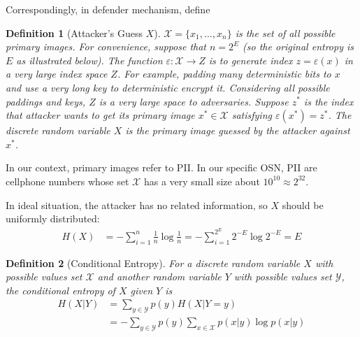 \documentclass[10pt, conference, compsocconf]{IEEEtran}
\newtheorem{mydef}{Definition}
\begin{document}
        Correspondingly, in defender mechanism, define
        \begin{mydef}[Attacker's Guess $X$]\label{def2}
            $\mathcal{X} = \{x_1, \ldots, x_n\}$ is the set of all possible
            primary images.
            For convenience, suppose that $n = 2^E$ (so the original entropy is $E$ as illustrated below).
            The function $\varepsilon: \mathcal X \rightarrow Z$ is to generate index $z = \varepsilon(x)$
            in a very large index space $Z$. For example, padding many deterministic bits to $x$ and use
            a very long key to deterministic encrypt it. Considering all possible paddings
            and keys, $Z$ is a very large space to adversaries.
            Suppose $z^*$ is the index that attacker wants to
            get its primary image $x^* \in \mathcal{X}$ satisfying $\varepsilon(x^*) = z^*$.
            The discrete random variable $X$ is the
            primary image guessed by the attacker against $x^*$.
        \end{mydef}

        In our context, primary images refer to PII.
        In our specific OSN, PII are cellphone numbers
        whose set $\mathcal X$ has a very small
        size about $10^{10} \approx 2^{32}$.

        In ideal situation, the attacker has no related information, so $X$ should
        be uniformly distributed:
        \begin{align*}
            H(X) &= -\sum_{i=1}^{n} \frac{1}{n} \log \frac{1}{n}
                = -\sum_{i=1}^{2^E} 2^{-E} \log 2^{-E}
                = E
        \end{align*}

        \begin{mydef}[Conditional Entropy\cite{math_book, info_measure}]\label{def_con_entropy}
            For a discrete random variable $X$ with
            possible values set $\mathcal X$ and another random
            variable $Y$ with possible values
            set $\mathcal{Y}$, the conditional entropy
            of $X$ given $Y$ is
            \begin{align}
                H(X|Y) &= \sum_{y \in \mathcal Y} p(y) H(X | Y = y)\\
                    &= -\sum_{y \in \mathcal Y} p(y) \sum_{x \in \mathcal X} p(x|y) \log p(x|y)
            \end{align}
        \end{mydef}
\end{document}

